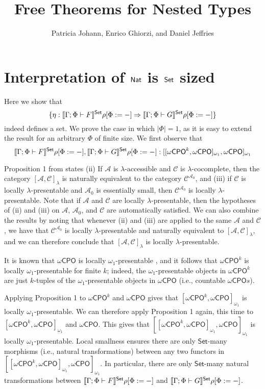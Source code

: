 \documentclass[acmsmall,review,anonymous]{acmart}
\title[Free Theorems for Nested Types]{Free Theorems for
  Nested Types} %
\author{Patricia Johann, Enrico Ghiorzi, and Daniel Jeffries}
\affiliation{
  \institution{Appalachian State University}            %
}
\theoremstyle{definition}
\newcommand{\set}{\mathsf{Set}}
\begin{document}
\section{Interpretation of $\mathsf{Nat}$ is $\mathsf{Set}$ sized}

\newcommand{\ocpo}{\omega \mathsf{CPO}}
Here we show that 
$$\{\eta : \setsem{\Gamma;\Phi \vdash F}\rho[\Phi := -]
\Rightarrow \setsem{\Gamma;\Phi \vdash G}\rho[\Phi := -]\}$$
indeed defines a set. We prove the case in which $|\Phi| = 1$, as
it is easy to extend the result for an arbitrary $\Phi$ of finite size. 
We first observe that 
$$\setsem{\Gamma;\Phi \vdash F}\rho[\Phi := -],
 \setsem{\Gamma;\Phi \vdash G}\rho[\Phi := -]
 : [[\ocpo^k , \ocpo]_{\omega_1}, \ocpo]_{\omega_1}  $$

Proposition 1 from \cite{LICS paper} states (ii)
If $\mathcal{A}$ is $\lambda$-accessible and $\mathcal{C}$
is $\lambda$-cocomplete, then the category $[\mathcal{A}, \mathcal{C}]_\lambda$
is naturally equivalent to the category 
$\mathcal{C}^{\mathcal{A}_0}$, and (iii) if $\mathcal{C}$
is locally $\lambda$-presentable and $\mathcal{A}_0$ is
essentially small, then $\mathcal{C}^{\mathcal{A}_0}$ is
locally $\lambda$-presentable. Note that if $\mathcal{A}$ and
$\mathcal{C}$ are locally $\lambda$-presentable, then the
hypotheses of (ii) and (iii) on $\mathcal{A}$, $\mathcal{A}_0$,
and $\mathcal{C}$ are automatically satisfied. We can 
also combine the results by noting that whenever (ii) and (iii) 
are applied to the same $\mathcal{A}$ and $\mathcal{C}$,
we have that $\mathcal{C}^{\mathcal{A}_0}$ is locally $\lambda$-presentable
and naturally equivalent to $[\mathcal{A}, \mathcal{C}]_\lambda$, and 
we can therefore conclude that $[\mathcal{A}, \mathcal{C}]_\lambda$ is 
locally $\lambda$-presentable.


It is known that $\ocpo$ is locally $\omega_1$-presentable \cite{Adamek/Rosicky},
and it follows that $\ocpo^k$ is locally $\omega_1$-presentable for finite $k$;
indeed, the $\omega_1$-presentable objects in $\ocpo^k$ are just
$k$-tuples of the $\omega_1$-presentable objects in $\ocpo$ (i.e., countable $\ocpo s$).


Applying Proposition 1 to $\ocpo^k$
and $\ocpo$ gives that $[\ocpo^k, \ocpo]_{\omega_1}$
is locally $\omega_1$-presentable. We can therefore
apply Proposition 1 again, this time to $[\ocpo^k, \ocpo]_{\omega_1}$
and $\ocpo$. This gives that 
 $[[\ocpo^k , \ocpo]_{\omega_1}, \ocpo]_{\omega_1}$
is locally $\omega_1$-presentable. Local smallness 
ensures there are only $\set$-many morphisms (i.e., natural transformations) 
between any two functors in
$[[\ocpo^k , \ocpo]_{\omega_1}, \ocpo]_{\omega_1}$.
In particular, there are only $\set$-many natural transformations
between $\setsem{\Gamma;\Phi \vdash F}\rho[\Phi := -]$ and 
$\setsem{\Gamma;\Phi \vdash G}\rho[\Phi := -]$.
\end{document}
